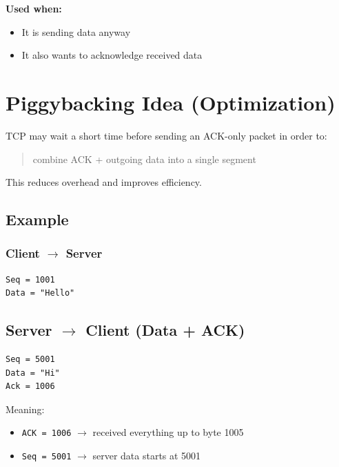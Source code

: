 \textbf{Used when:}
\begin{itemize}
    \item It is sending data anyway
    \item It also wants to acknowledge received data
\end{itemize}

\section{Piggybacking Idea (Optimization)}

TCP may wait a short time before sending an ACK-only packet in order to:

\begin{quote}
combine ACK + outgoing data into a single segment
\end{quote}

This reduces overhead and improves efficiency.

\subsection{Example}

\subsubsection{Client $\rightarrow$ Server}

\begin{verbatim}
Seq = 1001
Data = "Hello"
\end{verbatim}

\subsection{Server $\rightarrow$ Client (Data + ACK)}

\begin{verbatim}
Seq = 5001
Data = "Hi"
Ack = 1006
\end{verbatim}

Meaning:
\begin{itemize}
    \item \texttt{ACK = 1006} $\rightarrow$ received everything up to byte 1005
    \item \texttt{Seq = 5001} $\rightarrow$ server data starts at 5001
\end{itemize}

